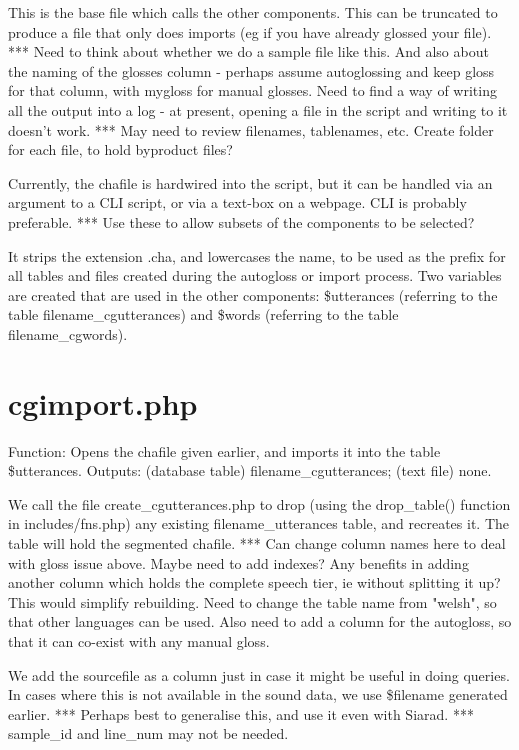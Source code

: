 \documentclass[a4paper,10pt]{article}
\begin{document}
This is the base file which calls the other components.  This can be truncated to produce a file that only does imports (eg if you have already glossed your file).  
*** Need to think about whether we do a sample file like this.  And also about the naming of the glosses column - perhaps assume autoglossing and keep gloss for that column, with mygloss for manual glosses.  Need to find a way of writing all the output into a log - at present, opening a file in the script and writing to it doesn't work.
*** May need to review filenames, tablenames, etc.  Create folder for each file, to hold byproduct files? 

Currently, the chafile is hardwired into the script, but it can be handled via an argument to a CLI script, or via a text-box on a webpage.  CLI is probably preferable.
*** Use these to allow subsets of the components to be selected?

It strips the extension .cha, and lowercases the name, to be used as the prefix for all tables and files created during the autogloss or import process.  Two variables are created that are used in the other components: \$utterances (referring to the table filename\_cgutterances) and \$words (referring to the table filename\_cgwords).


\section{cgimport.php}
\label{sec:import}

Function: Opens the chafile given earlier, and imports it into the table \$utterances.
Outputs: (database table) filename_cgutterances; (text file) none.

We call the file create\_cgutterances.php to drop (using the drop\_table() function in includes/fns.php) any existing filename\_utterances table, and recreates it.  The table will hold the segmented chafile.
*** Can change column names here to deal with gloss issue above.  Maybe need to add indexes?  Any benefits in adding another column which holds the complete speech tier, ie without splitting it up?  This would simplify rebuilding.  Need to change the table name from "welsh", so that other languages can be used.  Also need to add a column for the autogloss, so that it can co-exist with any manual gloss.

We add the sourcefile as a column just in case it might be useful in doing queries.  In cases where this is not available in the sound data, we use \$filename generated earlier. *** Perhaps best to generalise this, and use it even with Siarad. *** sample\_id and line\_num may not be needed.
\end{document}

